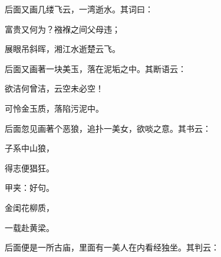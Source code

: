 \begin{parag}
    后面又画几缕飞云，一湾逝水。其词曰：
\end{parag}


\begin{poem}
    \begin{pl}富贵又何为？襁褓之间父母违；\end{pl}

    \begin{pl}展眼吊斜晖，湘江水逝楚云飞。\end{pl}

\end{poem}

\begin{parag}
    后面又画著一块美玉，落在泥垢之中。其断语云：
\end{parag}
\begin{poem}
    \begin{pl}欲洁何曾洁，云空未必空！\end{pl}

    \begin{pl}可怜金玉质，落陷污泥中。\end{pl}
\end{poem}

\begin{parag}
    后面忽见画著个恶狼，追扑一美女，欲啖之意。其书云：
\end{parag}


\begin{poem}
    \begin{pl}子系中山狼，\end{pl}

    \begin{pl}得志便猖狂。\end{pl}\begin{note}甲夹：好句。\end{note}

    \begin{pl}金闺花柳质，\end{pl}

    \begin{pl}一载赴黄梁。\end{pl}

\end{poem}

\begin{parag}
    后面便是一所古庙，里面有一美人在内看经独坐。其判云：
\end{parag}


